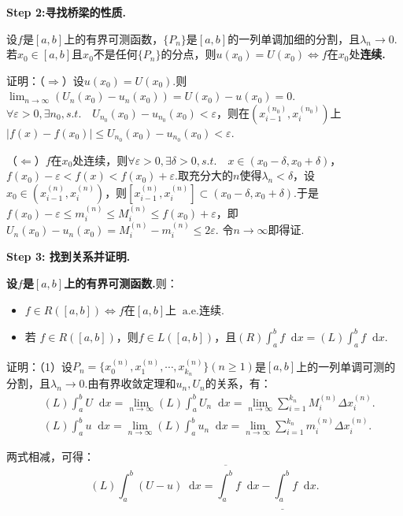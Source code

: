 \documentclass[bwprint, withoutpreface]{cumcmthesis}
\newcommand*{\dif}{\mathop{}\!\mathrm{d}}
\begin{document}
\textbf{Step 2:寻找桥梁的性质.}

设$f$是$[a, b]$上的有界可测函数，$\{P_n\}$是$[a, b]$的一列单调加细的分割，且$\lambda_n \to 0$.若$x_0 \in [a, b]$且$x_0$不是任何$\{P_n\}$的分点，则$u(x_0) = U(x_0) \Leftrightarrow f \mbox{在}x_0$处\textbf{连续.}

证明：（$\Rightarrow$）设$u(x_0) = U(x_0)$.则$\lim_{n \to \infty} (U_n(x_0) - u_n(x_0)) = U(x_0) - u(x_0) = 0$.$\forall \varepsilon > 0, \exists n_0, s.t. \quad U_{n_0}(x_0) - u_{n_0}(x_0) < \varepsilon$，则在$(x_{i - 1}^{(n_0)}, x_i^{(n_0)})$上$|f(x) - f(x_0)| \leqslant U_{n_0}(x_0) - u_{n_0}(x_0) < \varepsilon$.

（$\Leftarrow$）$f$在$x_0$处连续，则$\forall \varepsilon > 0, \exists \delta > 0, s.t. \quad x \in (x_0 - \delta, x_0 + \delta)$，$f(x_0) - \varepsilon < f(x) < f(x_0) + \varepsilon$.取充分大的$n$使得$\lambda_n < \delta$，设$x_0 \in (x_{i - 1}^{(n)}, x_i^{(n)})$，则$[x_{i - 1}^{(n)}, x_i^{(n)}] \subset (x_0 - \delta, x_0 + \delta)$.于是$f(x_0) - \varepsilon \leqslant m_i^{(n)} \leqslant M_i^{(n)} \leqslant f(x_0) + \varepsilon$，即$U_n(x_0) - u_n(x_0) = M_i^{(n)} - m_i^{(n)} \leqslant 2 \varepsilon$. 令$n \to \infty$即得证.

\textbf{Step 3: 找到关系并证明.}

\textbf{设$f$是$[a, b]$上的有界可测函数.}则：
\begin{itemize}[itemindent=2em]
	\item $f \in R([a, b]) \Leftrightarrow f \mbox{在} [a, b] \mbox{上} \mathop{} \! \mathrm{a.e.}$连续.
	\item 若 $f \in R([a, b])$，则$f \in L([a, b])$，且$(R) \int_{a}^{b} f \dif x = (L) \int_{a}^{b} f \dif x$.
\end{itemize}

证明：（1）设$P_n = \{x_0^{(n)}, x_1^{(n)}, \cdots, x_{k_n}^{(n)}\}(n \geqslant 1)$是$[a, b]$上的一列单调可测的分割，且$\lambda_n \to 0$.由有界收敛定理和$u_n, U_n$的关系，有：
\begin{align*}
 	& (L)\int_{a}^{b} U \dif x = \lim_{n \to \infty} (L) \int_{a}^{b} U_n \dif x = \lim_{n \to \infty}{\sum_{i = 1}^{k_n} M_i^{(n)} \Delta x_i^{(n)}}. \\
 	& (L)\int_{a}^{b} u \dif x = \lim_{n \to \infty} (L) \int_{a}^{b} u_n \dif x = \lim_{n \to \infty}{\sum_{i = 1}^{k_n} m_i^{(n)} \Delta x_i^{(n)}}.
\end{align*}

两式相减，可得：
\begin{equation*}
	(L) \int_{a}^{b} (U - u) \dif x = \overline{\int_{a}^{b}} f \dif x - \underline{\int_{a}^{b}} f \dif x.
\end{equation*}
\end{document}
